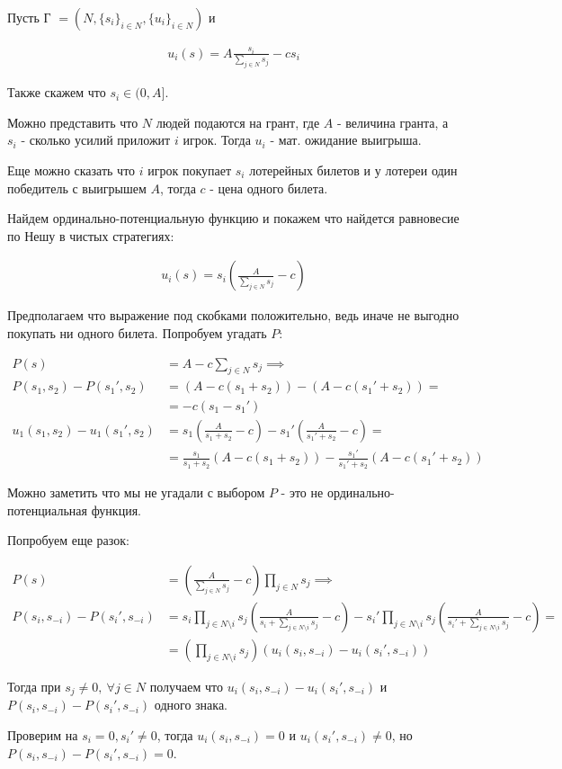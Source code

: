 \begin{exmpl}

	Пусть Г $= (N, \{s_i\}_{i \in N}, \{u_i\}_{i \in N})$ и

	\begin{align*}
		u_i(s) = A \frac{s_i}{\sum_{j \in N} s_j} - c s_i
	\end{align*}

	Также скажем что $s_i \in (0, A]$.

	Можно представить что $N$ людей подаются на грант, где  $A$ - величина гранта, а  $s_i$ - сколько усилий приложит  $i$ игрок.
	Тогда  $u_i$ - мат. ожидание выигрыша.

	Еще можно сказать что  $i$ игрок покупает  $s_i$ лотерейных билетов и у лотереи один победитель с выигрышем  $A$, тогда  $c$ - цена одного билета. 

	Найдем ординально-потенциальную функцию и покажем что найдется равновесие по Нешу в чистых стратегиях:

	\begin{align*}
		u_i(s) = s_i\left(\frac{A}{\sum_{j \in N} s_j} - c\right)
	\end{align*}

	Предполагаем что выражение под скобками положительно, ведь иначе не выгодно покупать ни одного билета. Попробуем угадать $P$:  

	\begin{align*}
		P(s) &= A - c \sum_{j \in N} s_j \implies \\
		P(s_1, s_2) - P(s_1', s_2) &= (A - c(s_1 + s_2)) - (A - c(s_1' + s_2)) = \\
								   &= -c(s_1 - s_1') \\
		u_1(s_1, s_2) - u_1(s_1', s_2) &= s_1 \left(\frac{A}{s_1 + s_2} - c\right) - s_1'\left(\frac{A}{s_1' + s_2} - c\right) = \\
									   &= \frac{s_1}{s_1 + s_2}(A - c(s_1 + s_2)) - \frac{s_1'}{s_1' + s_2}(A - c(s_1' + s_2))
	\end{align*}

	Можно заметить что мы не угадали с выбором $P$ - это не ординально-потенциальная функция.

	Попробуем еще разок:

	\begin{align*}
		P(s) &= \left(\frac{A}{\sum_{j \in N} s_j} - c\right) \prod_{j \in N} s_j \implies  \\
		P(s_{i}, s_{-i}) - P(s_i', s_{-i}) &= s_i \prod_{j \in N \setminus i } s_j \left(\frac{A}{s_i + \sum_{j \in N \setminus i} s_j} - c\right) - s_i' \prod_{j \in N \setminus i} s_j \left(\frac{A}{s_i' + \sum_{j \in N \setminus i} s_j} - c\right) = \\
						   &= \left(\prod_{j \in N \setminus i} s_j\right) \left( u_i(s_i, s_{-i}) - u_i(s_i', s_{-i}) \right) 
	\end{align*}

	Тогда при $s_j \neq 0, \ \forall j \in N$ получаем что  $u_i(s_i, s_{-i}) - u_i(s_i', s_{-i})$ и  $P(s_i, s_{-i}) - P(s_i', s_{-i})$ одного знака.

	Проверим на $s_i = 0, s_i' \neq 0$, тогда  $u_i(s_i, s_{-i}) = 0$ и  $u_i(s_i', s_{-i}) \neq 0$, но  $P(s_i, s_{-i}) - P(s_i', s_{-i}) = 0$.
\end{exmpl}

